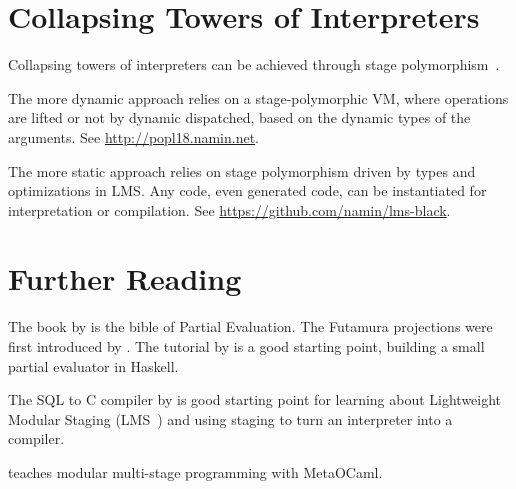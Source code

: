 \section{Collapsing Towers of Interpreters}

Collapsing towers of interpreters can be achieved through stage
polymorphism~\citep{collapsing-towers}.

The more dynamic approach relies on a stage-polymorphic VM, where
operations are lifted or not by dynamic dispatched,
based on the dynamic types of the arguments.
See \url{http://popl18.namin.net}.

The more static approach relies on stage polymorphism driven by types
and optimizations in LMS. Any code, even generated code, can be
instantiated for interpretation or compilation. See
\url{https://github.com/namin/lms-black}.

\section{Further Reading}

The book by \cite{pebook} is the bible of Partial Evaluation. The
Futamura projections were first introduced by
\cite{Futamura:1971,Futamura:1999}. The tutorial by \cite{petut} is a
good starting point, building a small partial evaluator in Haskell.

The SQL to C compiler by \cite{query-pearl} is good starting point for
learning about Lightweight Modular Staging (LMS~\citep{lms}) and using staging to
turn an interpreter into a compiler.

\cite{oleg-tutorial} teaches modular multi-stage programming with
MetaOCaml.
